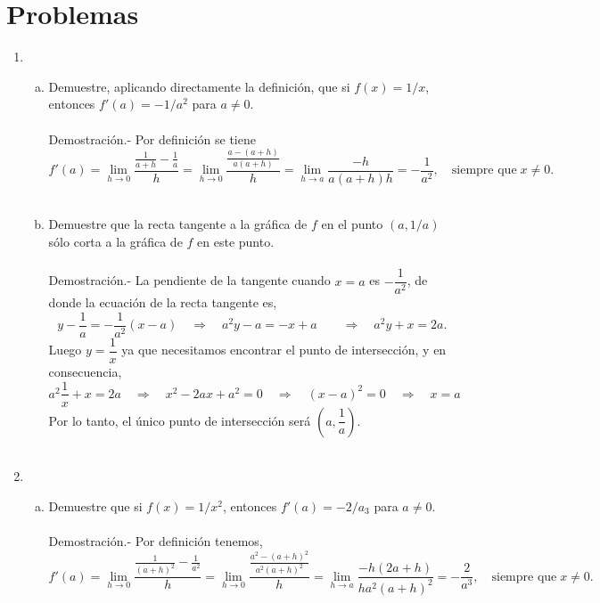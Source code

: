 \section{Problemas}

\begin{enumerate}[\bfseries 1]

    \item 
	\begin{enumerate}[(a)]

	    \item Demuestre, aplicando directamente la definición, que si $f(x)=1/x$, entonces $f'(a)=-1/a^2$ para $a\neq 0$.\\\\
		Demostración.-\; Por definición se tiene $$f'(a)=\lim_{h\to 0}\dfrac{\frac{1}{a+h}-\frac{1}{a}}{h} = \lim_{h\to 0} \dfrac{\frac{a-(a+h)}{a(a+h)}}{h} = \lim_{h\to a}\dfrac{-h}{a(a+h)h} = -\dfrac{1}{a^2}, \quad \mbox{siempre que}\; x\neq 0.$$\\

	    \item Demuestre que la recta tangente a la gráfica de $f$ en el punto $(a,1/a)$ sólo corta a la gráfica de $f$ en este punto.\\\\
		Demostración.-\; La pendiente de la tangente cuando $x=a$ es $-\dfrac{1}{a^2}$, de donde la ecuación de la recta tangente es,
		$$y-\dfrac{1}{a} = -\dfrac{1}{a^2}(x-a)\quad \Rightarrow \quad a^2y-a=-x+a \qquad \Rightarrow \quad a^2y+x=2a.$$
		Luego $y=\dfrac{1}{x}$ ya que necesitamos encontrar el punto de intersección, y en consecuencia,
		$$a^2\dfrac{1}{x}+x=2a\quad \Rightarrow \quad x^2-2ax+a^2=0 \quad \Rightarrow \quad (x-a)^2=0 \quad \Rightarrow \quad x=a$$
		Por lo tanto, el único punto de intersección será $\left(a,\dfrac{1}{a}\right)$.\\\\

	\end{enumerate}

    \item
	\begin{enumerate}[(a)]

	    \item Demuestre que si $f(x)=1/x^2$, entonces $f'(a)=-2/a_3$ para $a\neq 0$.\\\\
		Demostración.-\; Por definición tenemos,
		$$f'(a)=\lim_{h\to 0}\dfrac{\frac{1}{(a+h)^2}-\frac{1}{a^2}}{h} = \lim_{h\to 0} \dfrac{\frac{a^2-(a+h)^2}{a^2(a+h)^2}}{h} = \lim_{h\to a}\dfrac{-h(2a+h)}{ha^2(a+h)^2} = -\dfrac{2}{a^3}, \quad \mbox{siempre que}\; x\neq 0.$$\\


\end{enumerate}
\end{enumerate}
